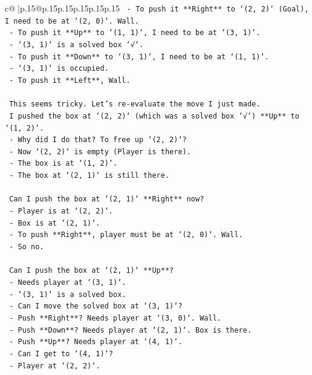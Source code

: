 \documentclass{article}
\begin{document}
{\begin{supertabular}{c@{$\;$}|p{.15\linewidth}@{}p{.15\linewidth}p{.15\linewidth}p{.15\linewidth}p{.15\linewidth}p{.15\linewidth}}
{{{\texttt{   {-} To push it **Right** to `(2, 2)` (Goal), I need to be at `(2, 0)`. Wall.} \\
\texttt{   {-} To push it **Up** to `(1, 1)`, I need to be at `(3, 1)`.} \\
\texttt{     {-} `(3, 1)` is a solved box `√`.} \\
\texttt{   {-} To push it **Down** to `(3, 1)`, I need to be at `(1, 1)`.} \\
\texttt{     {-} `(3, 1)` is occupied.} \\
\texttt{   {-} To push it **Left**, Wall.} \\
\\ 
\texttt{   This seems tricky. Let's re{-}evaluate the move I just made.} \\
\texttt{   I pushed the box at `(2, 2)` (which was a solved box `√`) **Up** to `(1, 2)`.} \\
\texttt{   {-} Why did I do that? To free up `(2, 2)`?} \\
\texttt{   {-} Now `(2, 2)` is empty (Player is there).} \\
\texttt{   {-} The box is at `(1, 2)`.} \\
\texttt{   {-} The box at `(2, 1)` is still there.} \\
\\ 
\texttt{   Can I push the box at `(2, 1)` **Right** now?} \\
\texttt{   {-} Player is at `(2, 2)`.} \\
\texttt{   {-} Box is at `(2, 1)`.} \\
\texttt{   {-} To push **Right**, player must be at `(2, 0)`. Wall.} \\
\texttt{   {-} So no.} \\
\\ 
\texttt{   Can I push the box at `(2, 1)` **Up**?} \\
\texttt{   {-} Needs player at `(3, 1)`.} \\
\texttt{   {-} `(3, 1)` is a solved box.} \\
\texttt{   {-} Can I move the solved box at `(3, 1)`?} \\
\texttt{     {-} Push **Right**? Needs player at `(3, 0)`. Wall.} \\
\texttt{     {-} Push **Down**? Needs player at `(2, 1)`. Box is there.} \\
\texttt{     {-} Push **Up**? Needs player at `(4, 1)`.} \\
\texttt{       {-} Can I get to `(4, 1)`?} \\
\texttt{       {-} Player at `(2, 2)`.} \\
}}}
\end{supertabular}}
\end{document}
